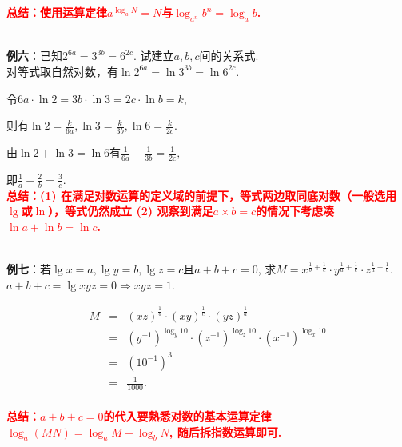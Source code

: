 \documentclass[8pt]{article}
\begin{document}
					\textcolor{red}{\textbf{总结：使用运算定律$a^{\log_{a}{N}}=N$与$\log_{a^n}{b^n}=\log_{a}{b}$.}}

				~\\

				\textbf{例六}：已知$\displaystyle 2^{6a}=3^{3b}=6^{2c}.$ 试建立$a, b, c$间的关系式.
					~\\

					对等式取自然对数，有$\displaystyle \ln{2^{6a}}=\ln{3^{3b}}=\ln{6^{2c}}.$

					令$\displaystyle 6a\cdot \ln{2}=3b\cdot \ln{3}=2c\cdot \ln{b}=k$,

					则有$\displaystyle \ln{2}=\frac{k}{6a}, \ln{3}=\frac{k}{3b}, \ln{6}=\frac{k}{2c}.$

					由$\displaystyle \ln{2}+\ln{3}=\ln{6}$有$\displaystyle \frac{1}{6a}+\frac{1}{3b}=\frac{1}{2c},$

					即$\displaystyle \frac{1}{a}+\frac{2}{b}=\frac{3}{c}.$
					~\\

					\textcolor{red}{\textbf{总结：(1) 在满足对数运算的定义域的前提下，等式两边取同底对数（一般选用$\lg$或$\ln$），等式仍然成立 (2) 观察到满足$a\times b=c$的情况下考虑凑$\ln{a}+\ln{b}=\ln{c}$.}}

				~\\

				\textbf{例七}：若$\displaystyle \lg{x}=a, \lg{y}=b, \lg{z}=c$且$a+b+c=0$, 求$\displaystyle M=x^{\frac{1}{b}+\frac{1}{c}}\cdot y^{\frac{1}{a}+\frac{1}{c}}\cdot z^{\frac{1}{a}+\frac{1}{b}}.$
					~\\

					$a+b+c=\lg{xyz}=0 \Rightarrow xyz=1$.

					$$
					\begin{array}{rcl}
						M&=&\displaystyle (xz)^{\frac{1}{b}}\cdot(xy)^{\frac{1}{c}}\cdot (yz)^{\frac{1}{a}}\\
						&=&\displaystyle \left(y^{-1}\right)^{\log_{y} 10}\cdot\left(z^{-1}\right)^{\log_{z} 10}\cdot\left(x^{-1}\right)^{\log_{x} 10}\\
						&=&\left(10^{-1}\right)^3\\
						&=&\displaystyle \frac{1}{1000}.\\
					\end{array}
					$$

					\textcolor{red}{\textbf{总结：$a+b+c=0$的代入要熟悉对数的基本运算定律$\log_{a}{(MN)}=\log_{a}{M}+\log_{b}{N}$, 随后拆指数运算即可.}}
\end{document}
